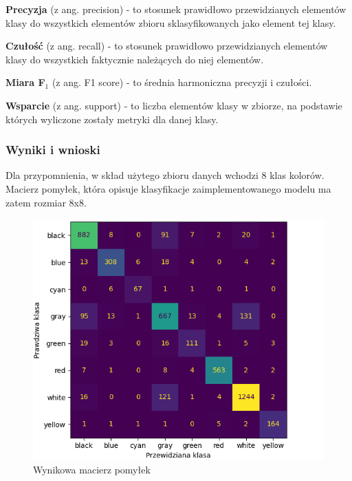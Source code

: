 \begin{description}
\item \textbf{Precyzja} (z ang. precision) - to stosunek prawidłowo przewidzianych elementów klasy do wszystkich elementów zbioru sklasyfikowanych jako element tej klasy.
\begin{center}
\end{center}

\item \textbf{Czułość} (z ang. recall) - to stosunek prawidłowo przewidzianych elementów klasy do wszystkich faktycznie należących do niej elementów.
\begin{center}
\end{center}

\item \textbf{Miara F$_{1}$} (z ang. F1 score) - to średnia harmoniczna precyzji i czułości.
\begin{center}
\end{center}

\item \textbf{Wsparcie} (z ang. support) - to liczba elementów klasy w zbiorze, na podstawie których wyliczone zostały metryki dla danej klasy.
\end{description}

\subsubsection{Wyniki i wnioski}
Dla przypomnienia, w skład użytego zbioru danych wchodzi 8 klas kolorów. Macierz pomyłek, która opisuje klasyfikacje zaimplementowanego modelu ma zatem rozmiar 8x8.

\begin{figure}[h!]
    \begin{center}
        \includegraphics[scale=0.87]{img/confusion_matrix.png}        
    \end{center}
    \caption{Wynikowa macierz pomyłek}
    \label{fig:confusion_matrix}
\end{figure}

